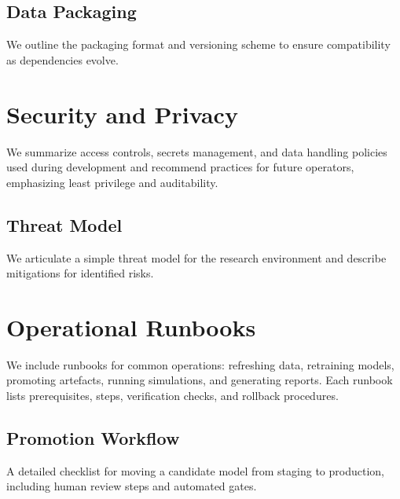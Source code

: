 \documentclass[12pt]{report}  %
\numberwithin{equation}{section}
\theoremstyle{plain}
\theoremstyle{definition}
\theoremstyle{remark}
\begin{document}
\section{Data Packaging}
We outline the packaging format and versioning scheme to ensure compatibility as dependencies evolve.

\chapter{Security and Privacy}
We summarize access controls, secrets management, and data handling policies used during development and recommend practices for future operators, emphasizing least privilege and auditability.

\section{Threat Model}
We articulate a simple threat model for the research environment and describe mitigations for identified risks.

\chapter{Operational Runbooks}
We include runbooks for common operations: refreshing data, retraining models, promoting artefacts, running simulations, and generating reports. Each runbook lists prerequisites, steps, verification checks, and rollback procedures.

\section{Promotion Workflow}
A detailed checklist for moving a candidate model from staging to production, including human review steps and automated gates.
\end{document}
